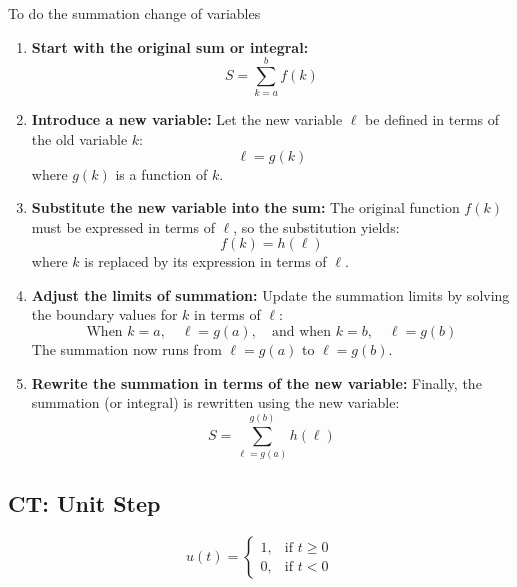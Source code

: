     \begin{process}
        To do the summation change of variables
        \begin{enumerate}
            \item \textbf{Start with the original sum or integral:}
            \[
            S = \sum_{k=a}^{b} f(k)
            \]
        
            \item \textbf{Introduce a new variable:}
            Let the new variable \(\ell\) be defined in terms of the old variable \(k\):
            \[
            \ell = g(k)
            \]
            where \(g(k)\) is a function of \(k\).
        
            \item \textbf{Substitute the new variable into the sum:}
            The original function \(f(k)\) must be expressed in terms of \(\ell\), so the substitution yields:
            \[
            f(k) = h(\ell)
            \]
            where \(k\) is replaced by its expression in terms of \(\ell\).
        
            \item \textbf{Adjust the limits of summation:}
            Update the summation limits by solving the boundary values for \(k\) in terms of \(\ell\):
            \[
            \text{When } k = a, \quad \ell = g(a), \quad \text{and when } k = b, \quad \ell = g(b)
            \]
            The summation now runs from \(\ell = g(a)\) to \(\ell = g(b)\).
        
            \item \textbf{Rewrite the summation in terms of the new variable:}
            Finally, the summation (or integral) is rewritten using the new variable:
            \[
            S = \sum_{\ell=g(a)}^{g(b)} h(\ell)
            \]
        \end{enumerate}
    \end{process}

\subsection{CT: Unit Step}
\begin{definition}
    \begin{equation}
        u(t) =
        \begin{cases}
        1, & \text{if } t \geq 0 \\
        0, & \text{if } t < 0
        \end{cases}
    \end{equation}

\end{definition}


